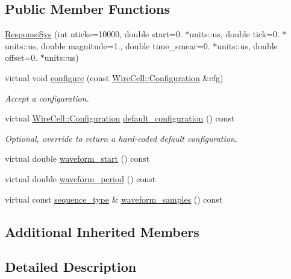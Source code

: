 \subsection*{Public Member Functions}
\begin{DoxyCompactItemize}
\item 
\hyperlink{class_wire_cell_1_1_gen_1_1_response_sys_a71ff5f000f152ebfe338a15f0d49f0ef}{Response\+Sys} (int nticks=10000, double start=0. $\ast$units\+::us, double tick=0. $\ast$units\+::us, double magnitude=1., double time\+\_\+smear=0. $\ast$units\+::us, double offset=0. $\ast$units\+::us)
\item 
virtual void \hyperlink{class_wire_cell_1_1_gen_1_1_response_sys_a38a9c888b02b4dcd447016ff77523ab7}{configure} (const \hyperlink{namespace_wire_cell_a9f705541fc1d46c608b3d32c182333ee}{Wire\+Cell\+::\+Configuration} \&cfg)
\begin{DoxyCompactList}\small\item\em Accept a configuration. \end{DoxyCompactList}\item 
virtual \hyperlink{namespace_wire_cell_a9f705541fc1d46c608b3d32c182333ee}{Wire\+Cell\+::\+Configuration} \hyperlink{class_wire_cell_1_1_gen_1_1_response_sys_a04c3840c5ba2e0c8046895ed0bd288b9}{default\+\_\+configuration} () const
\begin{DoxyCompactList}\small\item\em Optional, override to return a hard-\/coded default configuration. \end{DoxyCompactList}\item 
virtual double \hyperlink{class_wire_cell_1_1_gen_1_1_response_sys_a7b431ba8fb1668bd0b067f5f03b53171}{waveform\+\_\+start} () const
\item 
virtual double \hyperlink{class_wire_cell_1_1_gen_1_1_response_sys_ab6bced35ba8f8279d8204d842caf868a}{waveform\+\_\+period} () const
\item 
virtual const \hyperlink{class_wire_cell_1_1_i_waveform_ad8f85e800ab8082ddbd89ac91164db7d}{sequence\+\_\+type} \& \hyperlink{class_wire_cell_1_1_gen_1_1_response_sys_acfe9c4ac7194cd013c12168df9021005}{waveform\+\_\+samples} () const
\end{DoxyCompactItemize}
\subsection*{Additional Inherited Members}


\subsection{Detailed Description}


